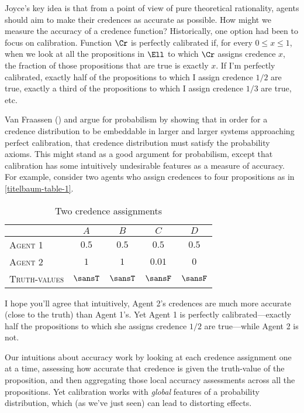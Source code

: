 Joyce's key idea is that from a point of view of pure theoretical rationality, agents should aim to make their credences as accurate as possible. How might we measure the accuracy of a credence function? Historically, one option had been to focus on calibration. Function $\Cr$ is perfectly calibrated if, for every $0 \le x \le 1$, when we look at all the propositions in $\Ell$ to which $\Cr$ assigns credence $x$, the fraction of those propositions that are true is exactly $x$. If I'm perfectly calibrated, exactly half of the propositions to which I assign credence $1/2$ are true, exactly a third of the propositions to which I assign credence $1/3$ are true, etc.

Van Fraassen (\citeyear{vanFraassenCalibration}) and \citet{ShimonyAdamite} argue for probabilism by showing that in order for a credence distribution to be embeddable in larger and larger systems approaching perfect calibration, that credence distribution must satisfy the probability axioms. This might stand as a good argument for probabilism, except that calibration has some intuitively undesirable features as a measure of accuracy. For example, consider two agents who assign credences to four propositions as in \autoref{titelbaum-table-1}.
\begin{table}[ht]
\centering
\begin{tabular}{lcccc}
\hline
						& $A$	    & $B$	    & $C$	    & $D$\\
\hline\hline
\textsc{Agent 1}		& $0.5$	    & $0.5$	    & $0.5$	    & $0.5$\\
\textsc{Agent 2}		& $1$	    & $1$	    & $0.01$	& $0$\\
\textsc{Truth-values}	& $\sansT$	& $\sansT$	& $\sansF$	& $\sansF$\\
\hline
\end{tabular}
\caption{Two credence assignments}\label{titelbaum-table-1}
\end{table} 
I hope you'll agree that intuitively, Agent 2's credences are much more accurate (close to the truth) than Agent 1's. Yet Agent 1 is perfectly calibrated---exactly half the propositions to which she assigns credence $1/2$ are true---while Agent 2 is not.

Our intuitions about accuracy work by looking at each credence assignment one at a time, assessing how accurate that credence is given the truth-value of the proposition, and then aggregating those local accuracy assessments across all the propositions. Yet calibration works with \emph{global} features of a probability distribution, which (as we've just seen) can lead to distorting effects.

